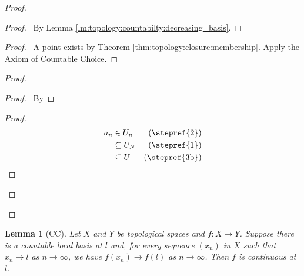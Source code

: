 \documentclass{book}
\let\qed\relax
\newtheorem{lm}{Lemma}[chapter]
\theoremstyle{definition}
\begin{document}
  \begin{proof}
    \begin{proof}
      \pf\ By Lemma \ref{lm:topology:countabilty:decreasing_basis}.
    \end{proof}
    \begin{proof}
      \pf\ A point exists by Theorem \ref{thm:topology:closure:membership}. 
      Apply 
      the Axiom of Countable Choice.
    \end{proof}
    \begin{proof}
      \pf
      \begin{proof}
        \pf\ By 
      \end{proof}
      \begin{proof}
        \pf
        \begin{align*}
          a_n & \in U_n & (\text{\stepref{2}}) \\
          & \subseteq U_N & (\text{\stepref{1}}) \\
          & \subseteq U & (\text{\stepref{3b}})
        \end{align*}
      \end{proof}
    \end{proof}
    \qed
  \end{proof}
  
  \begin{lm}[CC]
    Let $X$ and $Y$ be topological spaces and $f : X \rightarrow Y$. Suppose 
    there 
    is a countable local basis at $l$ and, for every sequence $(x_n)$ in $X$ 
    such 
    that $x_n \rightarrow l$ as $n \rightarrow \infty$, we have $f(x_n) 
    \rightarrow 
    f(l)$ as $n \rightarrow \infty$. Then $f$ is continuous at $l$.
  \end{lm}
  
\end{document}
